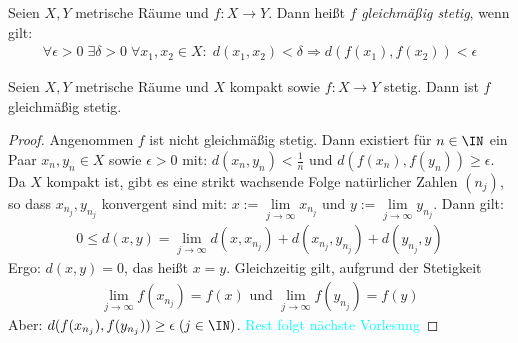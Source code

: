 \begin{Definition}%
	Seien $X,Y$ metrische Räume und $f:X \rightarrow Y$. Dann heißt $f$ 
	\emph{gleichmäßig stetig}, wenn gilt:
		\begin{align*}
			\forall \epsilon > 0 \; \exists \delta > 0 \; \forall x_1,x_2 \in X:
			\; d(x_1,x_2)< \delta \Rightarrow d(f(x_1),f(x_2)) < \epsilon
		\end{align*}
\end{Definition}

\begin{Satz}%
	Seien $X,Y$ metrische Räume und $X$ kompakt sowie $f:X \rightarrow Y$ stetig. 
	Dann ist $f$ gleichmäßig stetig.
\end{Satz}

\begin{proof}
	Angenommen $f$ ist nicht gleichmäßig stetig. Dann existiert für $n \in \IN$ ein 
	Paar $x_n,y_n \in X$ sowie $\epsilon > 0$ mit: $d(x_n,y_n) < \frac{1}{n}$ und 
	$d(f(x_n),f(y_n)) \geq \epsilon$.\\
	Da $X$ kompakt ist, gibt es eine strikt wachsende Folge natürlicher Zahlen 
	$(n_j)$, so dass $x_{n_j},y_{n_j}$ konvergent sind mit: $x:= \lim\limits_{j 
	\rightarrow \infty}{x_{n_j}}$ und $y := \lim\limits_{j \rightarrow \infty}{
	y_{n_j}}$. Dann gilt:
	\begin{align*}
		0 \leq d(x,y) = \lim\limits_{j\rightarrow \infty}{d(x,x_{n_j}) + 
		d(x_{n_j},y_{n_j}) + d(y_{n_j}, y)}
	\end{align*}
	Ergo: $d(x,y) = 0$, das heißt $x =y$.
	Gleichzeitig gilt, aufgrund der Stetigkeit 
	\begin{align*}
		\lim\limits_{j \rightarrow \infty}{f(x_{n_j})} = f(x) \text{ und } 
		\lim\limits_{j \rightarrow \infty}{f(y_{n_j})} = f(y) 
	\end{align*}
	Aber: $d(f(x_{n_j}),f(y_{n_j})) \geq \epsilon \; (j \in \IN)$.
	\textcolor{cyan}{Rest folgt nächste Vorlesung}
\end{proof}